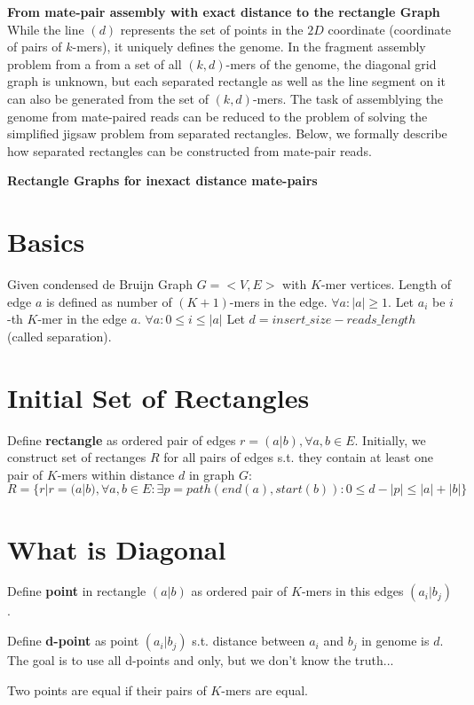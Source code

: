 \documentclass[a4paper]{article}
\begin{document}
\noindent
\textbf{From mate-pair assembly with exact distance to the rectangle Graph}
While the line $(d)$ represents the 
set of points in the $2D$ coordinate (coordinate of pairs of $k$-mers), it uniquely defines the genome.
In the fragment assembly problem from a from a set of all $(k,d)$-mers of the genome, 
the diagonal grid graph is unknown, but each separated rectangle as well 
as the line segment on it can also be generated
from the set of $(k,d)$-mers. The task of assemblying the genome from mate-paired reads can be 
reduced to the problem of solving the simplified jigsaw problem from separated rectangles.
Below, we formally describe how separated rectangles can be constructed from mate-pair reads. 

\noindent
\textbf{Rectangle Graphs for inexact distance mate-pairs}



\section{Basics}

Given condensed de Bruijn Graph $G = <V,E>$ with $K$-mer vertices.
Length of edge $a$ is defined as number of $(K+1)$-mers in the edge. $\forall a: |a| \geq 1$.
Let $a_i$ be $i$-th $K$-mer in the edge $a$. $\forall a: 0 \leq i \leq |a|$
Let $d = insert\_size - reads\_length$ (called separation).
\section{Initial Set of Rectangles}
Define \textbf{rectangle} as ordered pair of edges $r = (a|b), \forall a, b \in E$.
Initially, we construct set of rectanges $R$ for all pairs of edges s.t. they contain at least one pair of $K$-mers within distance $d$ in graph $G$:
$$ R = \{ r | r = (a|b), \forall a, b \in E : \exists p = path(end(a), start(b)) : 0 \leq d - |p| \leq |a| + |b| \} $$

\section{What is Diagonal}

Define \textbf{point} in rectangle $(a|b)$ as ordered pair of $K$-mers in this edges $(a_i|b_j)$.

Define \textbf{d-point} as point $(a_i|b_j)$ s.t. distance between $a_i$ and $b_j$ in genome is $d$. The goal is to use all d-points and only, but we don't know the truth...

Two points are equal if their pairs of $K$-mers are equal.
\end{document}
